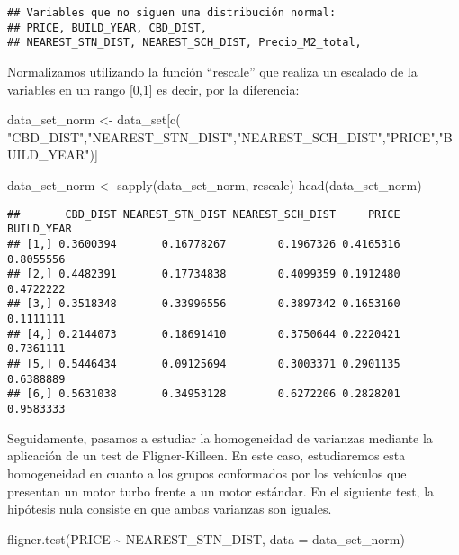 \documentclass[
]{article}
\newenvironment{Shaded}{\begin{snugshade}}{\end{snugshade}}
\newcommand{\AttributeTok}[1]{\textcolor[rgb]{0.77,0.63,0.00}{#1}}
\newcommand{\FunctionTok}[1]{\textcolor[rgb]{0.00,0.00,0.00}{#1}}
\newcommand{\NormalTok}[1]{#1}
\newcommand{\OtherTok}[1]{\textcolor[rgb]{0.56,0.35,0.01}{#1}}
\newcommand{\SpecialCharTok}[1]{\textcolor[rgb]{0.00,0.00,0.00}{#1}}
\newcommand{\StringTok}[1]{\textcolor[rgb]{0.31,0.60,0.02}{#1}}
\begin{document}
\begin{verbatim}
## Variables que no siguen una distribución normal:
## PRICE, BUILD_YEAR, CBD_DIST, 
## NEAREST_STN_DIST, NEAREST_SCH_DIST, Precio_M2_total,
\end{verbatim}

Normalizamos utilizando la función ``rescale'' que realiza un escalado
de la variables en un rango {[}0,1{]} es decir, por la diferencia:

\begin{Shaded}
\begin{Highlighting}[]
\NormalTok{data\_set\_norm }\OtherTok{\textless{}{-}}\NormalTok{ data\_set[}\FunctionTok{c}\NormalTok{( }\StringTok{"CBD\_DIST"}\NormalTok{,}\StringTok{"NEAREST\_STN\_DIST"}\NormalTok{,}\StringTok{"NEAREST\_SCH\_DIST"}\NormalTok{,}\StringTok{"PRICE"}\NormalTok{,}\StringTok{"BUILD\_YEAR"}\NormalTok{)]}

\NormalTok{data\_set\_norm }\OtherTok{\textless{}{-}} \FunctionTok{sapply}\NormalTok{(data\_set\_norm, rescale)}
\FunctionTok{head}\NormalTok{(data\_set\_norm)}
\end{Highlighting}
\end{Shaded}

\begin{verbatim}
##       CBD_DIST NEAREST_STN_DIST NEAREST_SCH_DIST     PRICE BUILD_YEAR
## [1,] 0.3600394       0.16778267        0.1967326 0.4165316  0.8055556
## [2,] 0.4482391       0.17734838        0.4099359 0.1912480  0.4722222
## [3,] 0.3518348       0.33996556        0.3897342 0.1653160  0.1111111
## [4,] 0.2144073       0.18691410        0.3750644 0.2220421  0.7361111
## [5,] 0.5446434       0.09125694        0.3003371 0.2901135  0.6388889
## [6,] 0.5631038       0.34953128        0.6272206 0.2828201  0.9583333
\end{verbatim}

Seguidamente, pasamos a estudiar la homogeneidad de varianzas mediante
la aplicación de un test de Fligner-Killeen. En este caso, estudiaremos
esta homogeneidad en cuanto a los grupos conformados por los vehículos
que presentan un motor turbo frente a un motor estándar. En el siguiente
test, la hipótesis nula consiste en que ambas varianzas son iguales.

\begin{Shaded}
\begin{Highlighting}[]
\FunctionTok{fligner.test}\NormalTok{(PRICE }\SpecialCharTok{\textasciitilde{}}\NormalTok{ NEAREST\_STN\_DIST, }\AttributeTok{data =}\NormalTok{ data\_set\_norm)}
\end{Highlighting}
\end{Shaded}
\end{document}
